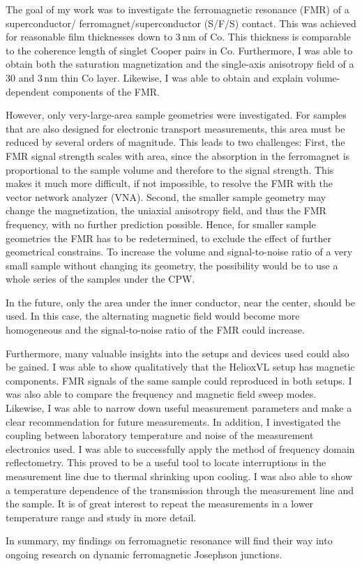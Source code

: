 
The goal of my work was to investigate the ferromagnetic resonance (FMR) of a superconductor/ ferromagnet/superconductor (S/F/S) contact. This was achieved for reasonable film thicknesses down to $3\,$nm of Co. This thickness is comparable to the coherence length of singlet Cooper pairs in Co. Furthermore, I was able to obtain both the saturation magnetization and the single-axis anisotropy field of a $30$ and $3\,$nm thin Co layer. Likewise, I was able to obtain and explain volume-dependent components of the FMR.

However, only very-large-area sample geometries were investigated. For samples that are also designed for electronic transport measurements, this area must be reduced by several orders of magnitude. This leads to two challenges: First, the FMR signal strength scales with area, since the absorption in the ferromagnet is proportional to the sample volume and therefore to the signal strength. This makes it much more difficult, if not impossible, to resolve the FMR with the vector network analyzer (VNA). Second, the smaller sample geometry may change the magnetization, the uniaxial anisotropy field, and thus the FMR frequency, with no further prediction possible. Hence, for smaller sample geometries the FMR has to be redetermined, to exclude the effect of further geometrical constrains. To increase the volume and signal-to-noise ratio of a very small sample without changing its geometry, the possibility would be to use a whole series of the samples under the CPW.

In the future, only the area under the inner conductor, near the center, should be used. In this case, the alternating magnetic field would become more homogeneous and the signal-to-noise ratio of the FMR could increase. 

Furthermore, many valuable insights into the setups and devices used could also be gained. I was able to show qualitatively that the HelioxVL setup has magnetic components. FMR signals of the same sample could reproduced in both setups. I was also able to compare the frequency and magnetic field sweep modes. Likewise, I was able to narrow down useful measurement parameters and make a clear recommendation for future measurements. In addition, I investigated the coupling between laboratory temperature and noise of the measurement electronics used. I was able to successfully apply the method of frequency domain reflectometry. This proved to be a useful tool to locate interruptions in the measurement line due to thermal shrinking upon cooling. I was also able to show a temperature dependence of the transmission through the measurement line and the sample. It is of great interest to repeat the measurements in a lower temperature range and study in more detail.

In summary, my findings on ferromagnetic resonance will find their way into ongoing research on dynamic ferromagnetic Josephson junctions.
\newpage